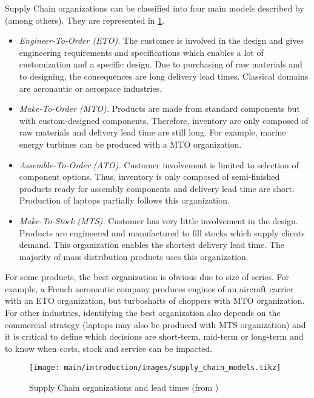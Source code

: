 Supply Chain organizations can be classified into four main models described by \citet{Arnold2007} (among others). They are represented in \cref{fig:supply-chain-models}.
\begin{itemize}
  \item \emph{Engineer-To-Order (ETO).}
  The customer is involved in the design and gives engineering requirements and specifications which enables a lot of customization and a specific design.
  Due to purchasing of raw materials and to designing, the consequences are long delivery lead times.
  Classical domains are aeronautic or aerospace industries.
  \item \emph{Make-To-Order (MTO).}
  Products are made from standard components but with custom-designed components.
  Therefore, inventory are only composed of raw materials and delivery lead time are still long.
  For example, marine energy turbines can be produced with a MTO organization.
  \item \emph{Assemble-To-Order (ATO).}
  Customer involvement is limited to selection of component options.
  Thus, inventory is only composed of semi-finished products ready for assembly components and delivery lead time are short.
  Production of laptops partially follows this organization.
  \item \emph{Make-To-Stock (MTS).}
  Customer has very little involvement in the design.
  Products are engineered and manufactured to fill stocks which supply clients demand.
  This organization enables the shortest delivery lead time.
  The majority of mass distribution products uses this organization.
\end{itemize}
For some products, the best organization is obvious due to size of series.
For example, a French aeronautic company produces engines of an aircraft carrier with an ETO organization, but turboshafts of choppers with MTO organization.
For other industries, identifying the best organization also depends on the commercial strategy (laptops may also be produced with MTS organization) and it is critical to define which decisions are short-term, mid-term or long-term and to know when costs, stock and service can be impacted.


\begin{figure}[h]
  \centering
  \texttt{[image: main/introduction/images/supply\_chain\_models.tikz]}
  \caption{Supply Chain organizations and lead times (from \citet{Arnold2007})}
  \label{fig:supply-chain-models}
\end{figure}


